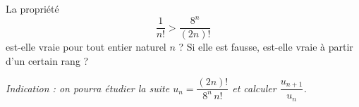 La propriété
\[
\frac{1}{n!} > \frac{8^n}{(2n)!}
\]
est-elle vraie pour tout entier naturel $n$ ? Si elle est fausse, est-elle
vraie à partir d'un certain rang ?

\emph{Indication : on pourra étudier la suite $u_n = \dfrac{(2n)!}{8^n\, n!}$ et
calculer $\dfrac{u_{n+1}}{u_n}$.}
